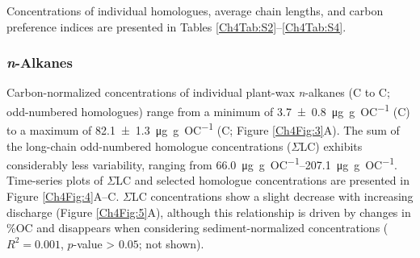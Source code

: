 Concentrations of individual homologues, average chain lengths, and carbon preference indices are presented in Tables \ref{Ch4Tab:S2}--\ref{Ch4Tab:S4}.

\subsubsection{\textit{n}-Alkanes}

Carbon-normalized concentrations of individual plant-wax \textit{n}-alkanes (C to C; odd-numbered homologues) range from a minimum of \SI{3.7 \pm 0.8}{\micro g.g.OC^{-1}} (C) to a maximum of \SI{82.1 \pm 1.3}{\micro g.g.OC^{-1}} (C; Figure \ref{Ch4Fig:3}A). The sum of the long-chain odd-numbered homologue concentrations ($\Sigma$LC) exhibits considerably less variability, ranging from \SIrange{66.0}{207.1}{\micro g.g.OC^{-1}}. Time-series plots of $\Sigma$LC and selected homologue concentrations are presented in Figure \ref{Ch4Fig:4}A--C. $\Sigma$LC concentrations show a slight decrease with increasing discharge (Figure \ref{Ch4Fig:5}A), although this relationship is driven by changes in \%OC and disappears when considering sediment-normalized concentrations ($R^2 = 0.001$, $p$-value > $0.05$; not shown).

